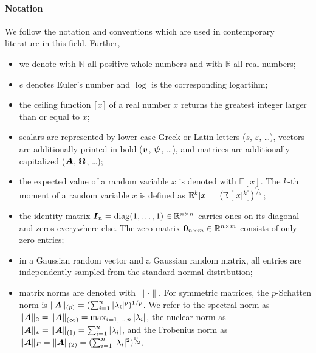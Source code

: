 \documentclass[12pt]{article}
\begin{document}
\paragraph{Notation}
We follow the notation and conventions which are used in contemporary literature in this field. Further,
\begin{itemize}
    \item we denote with $\mathbb{N}$ all positive whole numbers and with $\mathbb{R}$ all real numbers;
    \item $e$ denotes Euler's number and $\log$ is the corresponding logartihm;
    \item the ceiling function $\lceil x \rceil$ of a real number $x$ returns the greatest integer larger than or equal to $x$;
    \item scalars are represented by lower case Greek or Latin letters ($s$, $\varepsilon$, \dots),
    vectors are additionally printed in bold ($\boldsymbol{v}$, $\boldsymbol{\psi}$, \dots),
    and matrices are additionally capitalized ($\boldsymbol{A}$, $\boldsymbol{\Omega}$, \dots);
    \item the expected value of a random variable $x$ is denoted with $\mathbb{E}[x]$. The $k$-th moment of a random variable $x$ is defined as $\mathbb{E}^{k}[x] = \left(\mathbb{E}\left[ | x |^{k} \right] \right)^{{}^{1}{\mskip -5mu/\mskip -3mu}_{k}}$;
    \item the identity matrix $\boldsymbol{I}_n = \operatorname{diag}(1, \dots, 1) \in \mathbb{R}^{n \times n}$
    carries ones on its diagonal and zeros everywhere else. The zero matrix
    $\boldsymbol{0}_{n \times m} \in \mathbb{R}^{n \times m}$ consists of only zero entries;
    \item in a Gaussian random vector and a Gaussian random matrix, all entries are independently sampled from the standard normal distribution;
    \item matrix norms are denoted with $\lVert \cdot \rVert$. For symmetric matrices, the $p$-Schatten norm is
    $\lVert \boldsymbol{A} \rVert _{(p)} = (\sum_{i=1}^n |\lambda_i|^p)^{1/p}$. We refer to the spectral norm as $\lVert \boldsymbol{A} \rVert _2 = \lVert \boldsymbol{A} \rVert _{(\infty)} = \max_{i=1,\dots,n}|\lambda_i|$, the nuclear norm as $\lVert \boldsymbol{A} \rVert _{\ast} = \lVert \boldsymbol{A} \rVert _{(1)} = \sum_{i=1}^{n} |\lambda_i|$, and the Frobenius norm as $\lVert \boldsymbol{A} \rVert _F = \lVert \boldsymbol{A} \rVert _{(2)} = (\sum_{i=1}^{n} |\lambda_i|^2)^{{}^{1}{\mskip -5mu/\mskip -3mu}_{2}}$.
\end{itemize}

\end{document}
